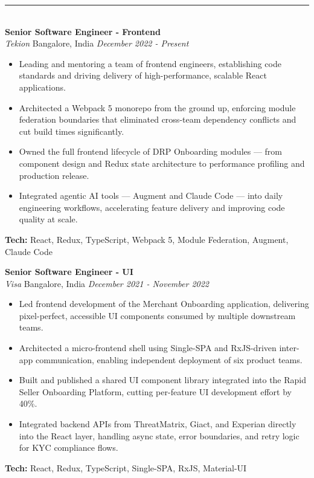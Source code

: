 \documentclass[a4paper,10pt]{article}
\begin{document}
\rule{\linewidth}{0.4pt}\\[2pt]
\textbf{Senior Software Engineer - Frontend}\\
\textit{Tekion} \textbar{} Bangalore, India \textbar{} \textit{\small December 2022 - Present}\\
\begin{itemize}[leftmargin=1.5em,itemsep=0pt,parsep=0pt,topsep=0pt,partopsep=0pt]
  \item Leading and mentoring a team of frontend engineers, establishing code standards and driving delivery of high-performance, scalable React applications.
  \item Architected a Webpack 5 monorepo from the ground up, enforcing module federation boundaries that eliminated cross-team dependency conflicts and cut build times significantly.
  \item Owned the full frontend lifecycle of DRP Onboarding modules — from component design and Redux state architecture to performance profiling and production release.
  \item Integrated agentic AI tools — Augment and Claude Code — into daily engineering workflows, accelerating feature delivery and improving code quality at scale.
\end{itemize}
\noindent\textbf{\small Tech:} \small React, Redux, TypeScript, Webpack 5, Module Federation, Augment, Claude Code
\vspace{3pt}

\textbf{Senior Software Engineer - UI}\\
\textit{Visa} \textbar{} Bangalore, India \textbar{} \textit{\small December 2021 - November 2022}\\
\begin{itemize}[leftmargin=1.5em,itemsep=0pt,parsep=0pt,topsep=0pt,partopsep=0pt]
  \item Led frontend development of the Merchant Onboarding application, delivering pixel-perfect, accessible UI components consumed by multiple downstream teams.
  \item Architected a micro-frontend shell using Single-SPA and RxJS-driven inter-app communication, enabling independent deployment of six product teams.
  \item Built and published a shared UI component library integrated into the Rapid Seller Onboarding Platform, cutting per-feature UI development effort by 40\%.
  \item Integrated backend APIs from ThreatMatrix, Giact, and Experian directly into the React layer, handling async state, error boundaries, and retry logic for KYC compliance flows.
\end{itemize}
\noindent\textbf{\small Tech:} \small React, Redux, TypeScript, Single-SPA, RxJS, Material-UI
\vspace{3pt}
\end{document}
